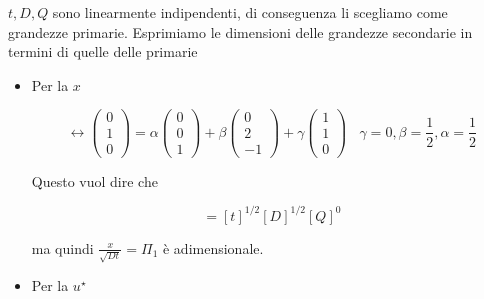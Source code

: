 \documentclass[10pt,a4paper,twoside,openright]{book}
\begin{document}
$t,D,Q$ sono linearmente indipendenti, di conseguenza li scegliamo come grandezze primarie. Esprimiamo le dimensioni delle grandezze secondarie in termini di quelle delle primarie
\begin{itemize}
    \item Per la $x$

          \begin{equation*}
              [ x] \leftrightarrow \begin{pmatrix}
                  0 \\
                  1 \\
                  0
              \end{pmatrix} =\alpha \begin{pmatrix}
                  0 \\
                  0 \\
                  1
              \end{pmatrix} +\beta \begin{pmatrix}
                  0 \\
                  2 \\
                  -1
              \end{pmatrix} +\gamma \begin{pmatrix}
                  1 \\
                  1 \\
                  0
              \end{pmatrix} \ \ \ \ \gamma =0,\beta =\frac{1}{2},\alpha =\frac{1}{2}
          \end{equation*}

          Questo vuol dire che

          \begin{equation*}
              [ x] =[ t]^{1/2}[ D]^{1/2}[ Q]^{0}
          \end{equation*}

          ma quindi $\frac{x}{\sqrt{Dt}} =\Pi _{1}$ è adimensionale.
    \item Per la $u^{\star }$


\end{itemize}
\end{document}
